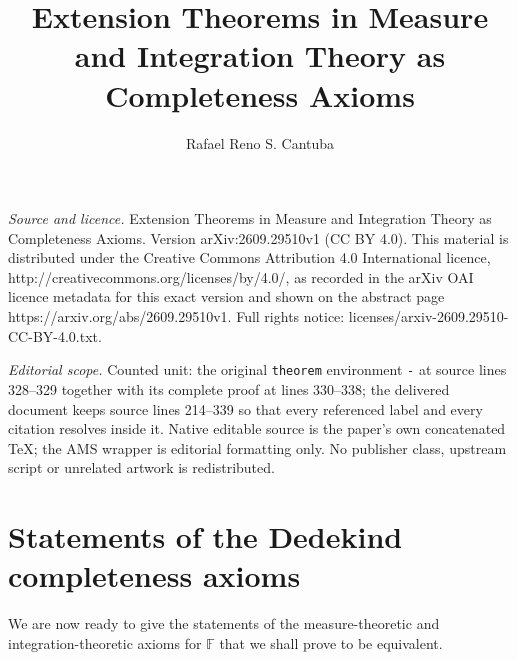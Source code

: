 \documentclass[10pt,a4paper]{amsart}
\def\F{\mathbb{F}}
\begin{document}
\title[Extension Theorems in Measure and Integration Theory as Comp]{Extension Theorems in Measure and Integration Theory as Completeness Axioms}
\author{Rafael Reno S. Cantuba}
\date{}
\maketitle
\noindent\emph{Source and licence.} Extension Theorems in Measure and Integration Theory as Completeness Axioms. Version arXiv:2609.29510v1 (CC BY 4.0). This material is distributed under the Creative Commons Attribution 4.0 International licence, http://creativecommons.org/licenses/by/4.0/, as recorded in the arXiv OAI licence metadata for this exact version and shown on the abstract page https://arxiv.org/abs/2609.29510v1. Full rights notice: licenses/arxiv-2609.29510-CC-BY-4.0.txt.\par\smallskip
\noindent\textit{Editorial scope.} Counted unit: the original \texttt{theorem} environment \texttt{-} at source lines 328--329 together with its complete proof at lines 330--338; the delivered document keeps source lines 214--339 so that every referenced label and every citation resolves inside it. Native editable source is the paper's own concatenated TeX; the AMS wrapper is editorial formatting only. No publisher class, upstream script or unrelated artwork is redistributed.
\section{Statements of the Dedekind completeness axioms}\label{StateSec}

We are now ready to give the statements of the measure-theoretic and integration-theoretic axioms for $\F$ that we shall prove to be equivalent.
\end{document}
